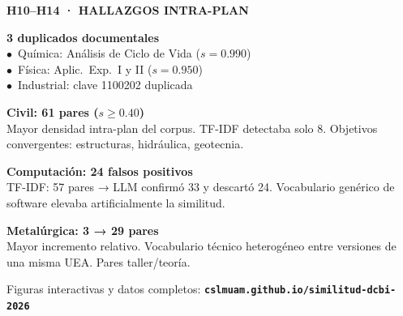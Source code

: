 \documentclass[9pt,a4paper]{article}
\newcommand{\SECTHEAD}[1]{%
  {\footnotesize\bfseries\color{uamblue}\MakeUppercase{#1}}\par\vspace{2pt}}
\begin{document}
\vfill

\begin{tcolorbox}[whitebox]
\SECTHEAD{h10–h14 · hallazgos intra-plan}
\begin{minipage}[t]{0.237\linewidth}
\begin{tcolorbox}[famcard,colback=uamred!7,colframe=uamred,
  borderline west={3pt}{0pt}{uamred}]
{\footnotesize\bfseries\color{uamred}3 duplicados documentales}\\[1pt]
{\tiny\color{uamgray}%
\textcolor{cQui}{$\bullet$}~Química: Análisis de Ciclo de Vida ($s=0.990$)\\
\textcolor{cFis}{$\bullet$}~Física: Aplic.\ Exp.\ I y II ($s=0.950$)\\
\textcolor{cInd}{$\bullet$}~Industrial: clave 1100202 duplicada}
\end{tcolorbox}
\end{minipage}\hfill
\begin{minipage}[t]{0.237\linewidth}
\begin{tcolorbox}[famcard,colback=cCiv!7,colframe=cCiv,
  borderline west={3pt}{0pt}{cCiv}]
{\footnotesize\bfseries\color{cCiv}Civil: 61 pares ($s\geq0.40$)}\\[1pt]
{\tiny\color{uamgray}Mayor densidad intra-plan del corpus.
TF-IDF detectaba solo 8.
Objetivos convergentes: estructuras, hidráulica, geotecnia.}
\end{tcolorbox}
\end{minipage}\hfill
\begin{minipage}[t]{0.237\linewidth}
\begin{tcolorbox}[famcard,colback=cCmp!7,colframe=cCmp,
  borderline west={3pt}{0pt}{cCmp}]
{\footnotesize\bfseries\color{cCmp}Computación: 24 falsos positivos}\\[1pt]
{\tiny\color{uamgray}TF-IDF: 57 pares → LLM confirmó 33
y descartó 24. Vocabulario genérico de software
elevaba artificialmente la similitud.}
\end{tcolorbox}
\end{minipage}\hfill
\begin{minipage}[t]{0.237\linewidth}
\begin{tcolorbox}[famcard,colback=cMet!7,colframe=cMet,
  borderline west={3pt}{0pt}{cMet}]
{\footnotesize\bfseries\color{cMet}Metalúrgica: 3 → 29 pares}\\[1pt]
{\tiny\color{uamgray}Mayor incremento relativo.
Vocabulario técnico heterogéneo entre versiones
de una misma UEA. Pares taller/teoría.}
\end{tcolorbox}
\end{minipage}
\end{tcolorbox}

\vfill

\begin{tcolorbox}[enhanced,colback=uamred!5,colframe=uamlgray,
  sharp corners,left=6pt,right=6pt,top=3pt,bottom=3pt]
\centering
{\footnotesize\color{uamgray}Figuras interactivas y datos completos:}\quad
{\footnotesize\bfseries\color{uamred}\texttt{cslmuam.github.io/similitud-dcbi-2026}}
\end{tcolorbox}
\end{document}
